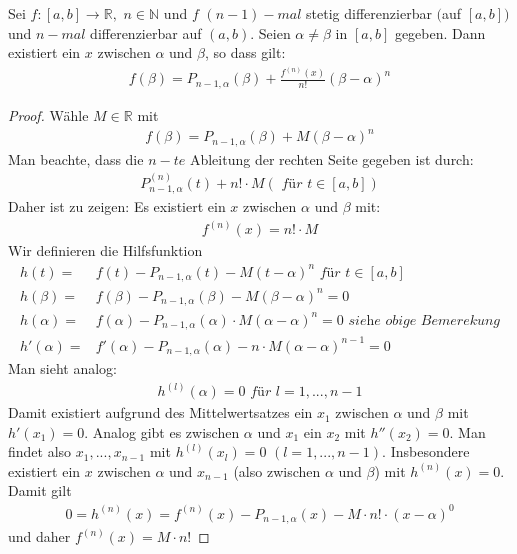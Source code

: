 \begin{Satz}{
	Sei $f: [a,b] \rightarrow \mathbb{R},$ $n \in \mathbb{N}$ und 
	$f$ $(n-1)-mal$ stetig differenzierbar $($auf $[a,b])$ und 
	$n-mal$ differenzierbar auf $(a,b)$. Seien $\alpha \neq \beta$ 
	in $[a,b]$ gegeben. Dann existiert ein $x$ zwischen $\alpha$ 
	und $\beta$, so dass gilt: 
	\begin{align*}
		f(\beta) = P_{n-1, \alpha}(\beta) + \frac{f^{(n)}(x)}{n!}(\beta - \alpha)^n
	\end{align*}
}\end{Satz}

\begin{proof}
	Wähle $M \in \mathbb{R}$ mit 
	\begin{align*}
		f(\beta) = P_{n-1,\alpha}(\beta) + M (\beta - \alpha)^n
	\end{align*}
	Man beachte, dass die $n-te$ Ableitung der rechten Seite gegeben ist durch:
	\begin{align*}
		P_{n-1, \alpha}^	{(n)}(t) + n! \cdot M (\textit{ für } t \in [a,b])
	\end{align*}
	Daher ist zu zeigen: Es existiert ein $x$ zwischen $\alpha$ und $\beta$ mit:
	\begin{align*}
		f^{(n)}(x) = n! \cdot M
	\end{align*}
	Wir definieren die Hilfsfunktion 
	\begin{align*}
		h(t) = & f(t) - P_{n-1, \alpha}(t) - M(t - \alpha)^n 
		\textit{ für } t \in [a,b] \\
		h(\beta) = & f(\beta) - P_{n-1, \alpha}(\beta) - M(\beta- \alpha)^n = 0 \\
		h(\alpha) = & f(\alpha) - P_{n-1, \alpha}(\alpha) \cdot 
		M(\alpha -\alpha)^n = 0 
		\textit{ siehe obige Bemerekung} \\
		h'(\alpha) = & f'(\alpha) - P_{n-1, \alpha}(\alpha) - 
		n \cdot M(\alpha - \alpha)^{n-1} = 0
	\end{align*} 
	Man sieht analog:
	\begin{align*}
		h^{(l)}(\alpha) = 0 \textit{ für } l = 1, ..., n-1
	\end{align*}
	Damit existiert aufgrund des Mittelwertsatzes ein $x_1$ zwischen $\alpha$ und 
	$\beta$ mit $h'(x_1) = 0$. Analog gibt es zwischen $\alpha$ und 
	$x_1$ ein $x_2$ mit $h''(x_2) = 0$. Man findet also $x_1, ..., x_{n-1}$ mit 
	$h^{(l)}(x_l) = 0$ $( l = 1, ..., n-1)$. Insbesondere existiert ein $x$ 
	zwischen $\alpha$ und $x_{n-1}$ (also zwischen $\alpha$ und $\beta$) mit 
	$h^{(n)}(x) = 0$. Damit gilt 
	\begin{align*}
		0 = h^{(n)}(x) = f^{(n)}(x) - P_{n-1, \alpha}(x) - M \cdot n! \cdot 
		(x-\alpha)^0
	\end{align*}
	und daher $f^{(n)}(x) = M \cdot n!$
\end{proof}	

